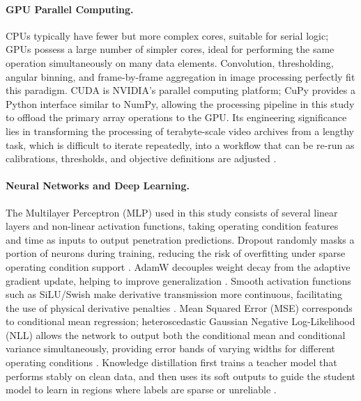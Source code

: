 \paragraph{GPU Parallel Computing.}
CPUs typically have fewer but more complex cores, suitable for serial logic; GPUs possess a large number of simpler cores, ideal for performing the same operation simultaneously on many data elements. Convolution, thresholding, angular binning, and frame-by-frame aggregation in image processing perfectly fit this paradigm. CUDA is NVIDIA's parallel computing platform; CuPy provides a Python interface similar to NumPy, allowing the processing pipeline in this study to offload the primary array operations to the GPU. Its engineering significance lies in transforming the processing of terabyte-scale video archives from a lengthy task, which is difficult to iterate repeatedly, into a workflow that can be re-run as calibrations, thresholds, and objective definitions are adjusted \cite{NickollsBuckGarlandSkadron2008}.

\paragraph{Neural Networks and Deep Learning.}
The Multilayer Perceptron (MLP) used in this study consists of several linear layers and non-linear activation functions, taking operating condition features and time as inputs to output penetration predictions. Dropout randomly masks a portion of neurons during training, reducing the risk of overfitting under sparse operating condition support \cite{Srivastava2014Dropout}. AdamW decouples weight decay from the adaptive gradient update, helping to improve generalization \cite{LoshchilovHutter2019AdamW}. Smooth activation functions such as SiLU/Swish make derivative transmission more continuous, facilitating the use of physical derivative penalties \cite{Ramachandran2017Swish}. Mean Squared Error (MSE) corresponds to conditional mean regression; heteroscedastic Gaussian Negative Log-Likelihood (NLL) allows the network to output both the conditional mean and conditional variance simultaneously, providing error bands of varying widths for different operating conditions \cite{KendallGal2017}. Knowledge distillation first trains a teacher model that performs stably on clean data, and then uses its soft outputs to guide the student model to learn in regions where labels are sparse or unreliable \cite{HintonVinyalsDean2015}.

